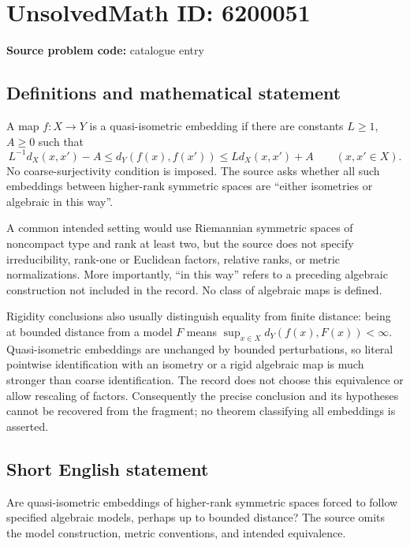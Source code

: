\documentclass[11pt]{article}
\begin{document}
\section*{UnsolvedMath ID: 6200051}
\textbf{Source problem code:} catalogue entry
\subsection{Definitions and mathematical statement}
A map $f:X\to Y$ is a quasi-isometric embedding if there are constants $L\geq1$, $A\geq0$ such that
\[
L^{-1}d_X(x,x')-A\leq d_Y(f(x),f(x'))\leq Ld_X(x,x')+A
\qquad(x,x'\in X).
\]
No coarse-surjectivity condition is imposed. The source asks whether all such embeddings between higher-rank symmetric spaces are ``either isometries or algebraic in this way''.

A common intended setting would use Riemannian symmetric spaces of noncompact type and rank at least two, but the source does not specify irreducibility, rank-one or Euclidean factors, relative ranks, or metric normalizations. More importantly, ``in this way'' refers to a preceding algebraic construction not included in the record. No class of algebraic maps is defined.

Rigidity conclusions also usually distinguish equality from finite distance: being at bounded distance from a model $F$ means $\sup_{x\in X}d_Y(f(x),F(x))<\infty$. Quasi-isometric embeddings are unchanged by bounded perturbations, so literal pointwise identification with an isometry or a rigid algebraic map is much stronger than coarse identification. The record does not choose this equivalence or allow rescaling of factors. Consequently the precise conclusion and its hypotheses cannot be recovered from the fragment; no theorem classifying all embeddings is asserted.
\subsection{Short English statement}
Are quasi-isometric embeddings of higher-rank symmetric spaces forced to follow specified algebraic models, perhaps up to bounded distance? The source omits the model construction, metric conventions, and intended equivalence.
\end{document}
